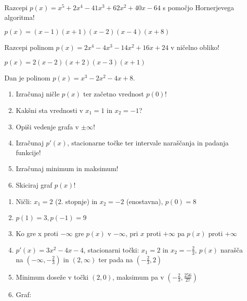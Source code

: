 \begin{vaja}
  Razcepi $p(x)=x^5+2x^4-41x^3+62x^2+40x-64$  s pomočjo Hornerjevega algoritma!


  \begin{odgovor}
    $p(x)=(x-1)(x+1)(x-2)(x-4)(x+8)$
  \end{odgovor}
\end{vaja}

\begin{vaja}
  Razcepi polinom $p(x)=2x^4-4x^3-14x^2+16x+24$  v ničelno obliko!




  \begin{odgovor}
    $p(x)=2(x-2)(x+2)(x-3)(x+1)$
  \end{odgovor}
\end{vaja}

\begin{vaja}
  Dan je polinom $p(x)= x^3-2x^2-4x+8$.
\begin{enumerate}

\item Izračunaj ničle $p(x)$ ter začetno vrednost $p(0)$!

\item Kakšni sta vrednosti v $x_1=1$ in $x_2=-1$?
\item Opiši vedenje grafa v $\pm \infty$!
\item Izračunaj $p'(x)$, stacionarne točke ter intervale naraščanja in padanja funkcije!
\item Izračunaj minimum in maksimum!
\item Skiciraj graf $p(x)$!
\end{enumerate}

  \begin{odgovor}
    \begin{enumerate}
\item Ničli: $x_1=2$ (2. stopnje) in $x_2=-2$ (enostavna), $p(0)=8$
\item $p(1)=3, p(-1)=9$
\item Ko gre x proti $-\infty$ gre $p(x)$ v $-\infty$, pri $x$ proti $+\infty$ pa $p(x)$ proti $+\infty$
\item $p'(x)=3x^2-4x-4$, stacionarni točki: $x_1=2$ in $x_2=-\frac{2}{3}$, $p(x)$ narašča na $(-\infty, -\frac{2}{3})$  in $(2, \infty)$ ter pada na $(-\frac{2}{3}, 2)$
\item Minimum doseže v točki $(2, 0)$, maksimum pa v $(-\frac{2}{3}, \frac{256}{27})$
\item Graf:
\begin{figure}[h!]


\end{figure}
\end{enumerate}
\end{odgovor}
\end{vaja}
